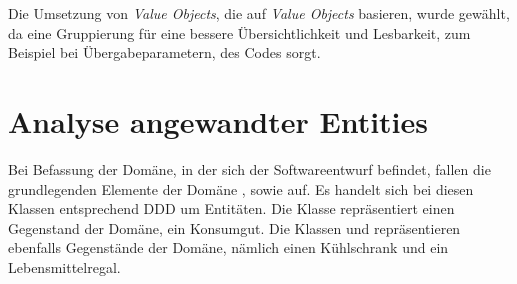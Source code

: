 Die Umsetzung von \textit{Value Objects}, die auf \textit{Value Objects} basieren, wurde gewählt, da eine Gruppierung für eine bessere Übersichtlichkeit und Lesbarkeit, zum Beispiel bei Übergabeparametern, des Codes sorgt.

\section{Analyse angewandter Entities}
\label{domaindrivendesign>entities}
Bei Befassung der Domäne, in der sich der Softwareentwurf befindet, fallen die grundlegenden Elemente der Domäne \href{https://github.com/lucasmerkel/dhbw-advancedswe-programmentwurf/blob/5764d7da4cfd0562ed8e96128e92f85c30b7309d/swe_programmentwurf/consumergoods-inventory-planner/3-cip-domain/src/main/java/de/dhbw/cip/domain/ConsumerGoods.java}{}, \href{https://github.com/lucasmerkel/dhbw-advancedswe-programmentwurf/blob/5764d7da4cfd0562ed8e96128e92f85c30b7309d/swe_programmentwurf/consumergoods-inventory-planner/3-cip-domain/src/main/java/de/dhbw/cip/domain/Fridge.java}{} sowie \href{https://github.com/lucasmerkel/dhbw-advancedswe-programmentwurf/blob/5764d7da4cfd0562ed8e96128e92f85c30b7309d/swe_programmentwurf/consumergoods-inventory-planner/3-cip-domain/src/main/java/de/dhbw/cip/domain/FoodShelf.java}{} auf.
Es handelt sich bei diesen Klassen entsprechend \ac{DDD} um Entitäten.
Die Klasse \href{https://github.com/lucasmerkel/dhbw-advancedswe-programmentwurf/blob/5764d7da4cfd0562ed8e96128e92f85c30b7309d/swe_programmentwurf/consumergoods-inventory-planner/3-cip-domain/src/main/java/de/dhbw/cip/domain/ConsumerGoods.java}{} repräsentiert einen Gegenstand der Domäne, ein Konsumgut.
Die Klassen \href{https://github.com/lucasmerkel/dhbw-advancedswe-programmentwurf/blob/5764d7da4cfd0562ed8e96128e92f85c30b7309d/swe_programmentwurf/consumergoods-inventory-planner/3-cip-domain/src/main/java/de/dhbw/cip/domain/Fridge.java}{} und \href{https://github.com/lucasmerkel/dhbw-advancedswe-programmentwurf/blob/5764d7da4cfd0562ed8e96128e92f85c30b7309d/swe_programmentwurf/consumergoods-inventory-planner/3-cip-domain/src/main/java/de/dhbw/cip/domain/FoodShelf.java}{} repräsentieren ebenfalls Gegenstände der Domäne, nämlich einen Kühlschrank und ein Lebensmittelregal.
